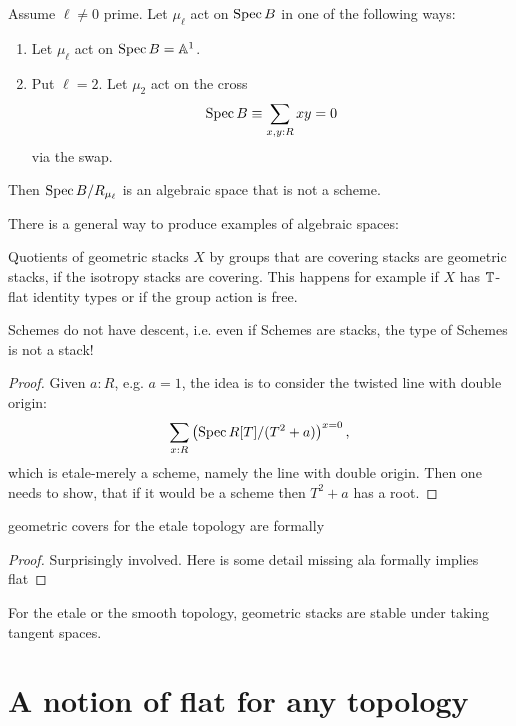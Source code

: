 \documentclass{article}
\begin{document}
	
	\begin{example}
		Assume $\ell \neq 0$ prime. Let $\mu_\ell$ act on $\operatorname{Spec} B$ in one of the following ways:
		\begin{enumerate}
			\item Let $\mu_\ell$ act on $\operatorname{Spec} B = \mathbb{A}^1$. 
			\item Put $\ell= 2$. Let $\mu_2$ act on the cross
			\[
			\operatorname{Spec} B \equiv \sum_{x , y : R} x y = 0
			\]
			via the swap.
		\end{enumerate}
		Then $\operatorname{Spec} B / R_{\mu_\ell}$ is an algebraic space that is not a scheme.
	\end{example}
	There is a general way to produce examples of algebraic spaces:
	\begin{lemma}
		Quotients of geometric stacks $X$ by groups that are covering stacks are geometric stacks, if the isotropy stacks are covering. This happens for example if $X$ has $\mathbb{T}$-flat identity types or if the group action is free.    
	\end{lemma}
	\begin{theorem}
		Schemes do not have descent, i.e. even if Schemes are stacks, the type of Schemes is not a stack!
	\end{theorem}
	\begin{proof}
	Given $a : R$, e.g. $a = 1$, the idea is to consider the twisted line with double origin:
		\[\sum_{x : R} \left(\operatorname{Spec} R[T]/(T^2+a)\right)^{x = 0},\]
		which is etale-merely a scheme, namely the line with double origin. Then one needs to show, that if it would be a scheme then $T^2 + a$ has a root.		
	\end{proof}	
	\begin{theorem}
		geometric covers for the etale topology are formally \etale
	\end{theorem}
	\begin{proof}
		Surprisingly involved. Here is some detail missing ala formally \etale implies flat
	\end{proof}
	\begin{prop}
		For the etale or the smooth topology, geometric stacks are stable under taking tangent spaces.
	\end{prop}
	\section{A notion of flat for any topology}
	
\end{document}
